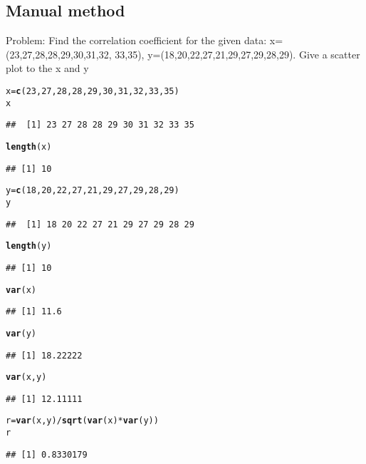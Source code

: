 \documentclass{article}\usepackage[]{graphicx}\usepackage[]{xcolor}
\makeatletter
\newcommand{\hlnum}[1]{\textcolor[rgb]{0.686,0.059,0.569}{#1}}%
\newcommand{\hlopt}[1]{\textcolor[rgb]{0,0,0}{#1}}%
\newcommand{\hldef}[1]{\textcolor[rgb]{0.345,0.345,0.345}{#1}}%
\newcommand{\hlkwb}[1]{\textcolor[rgb]{0.69,0.353,0.396}{#1}}%
\newcommand{\hlkwd}[1]{\textcolor[rgb]{0.737,0.353,0.396}{\textbf{#1}}}%
\newenvironment{kframe}{%
 \def\at@end@of@kframe{}%
 \ifinner\ifhmode%
  \def\at@end@of@kframe{\end{minipage}}%
  \begin{minipage}{\columnwidth}%
 \fi\fi%
 \def\FrameCommand##1{\hskip\@totalleftmargin \hskip-\fboxsep
 \colorbox{shadecolor}{##1}\hskip-\fboxsep
     \hskip-\linewidth \hskip-\@totalleftmargin \hskip\columnwidth}%
 \MakeFramed {\advance\hsize-\width
   \@totalleftmargin\z@ \linewidth\hsize
   \@setminipage}}%
 {\par\unskip\endMakeFramed%
 \at@end@of@kframe}
\newenvironment{knitrout}{}{} %
\makeatother
\begin{document}
\subsection{Manual method}
Problem: \newline
Find the correlation coefficient for the given data: x=(23,27,28,28,29,30,31,32, 33,35), y=(18,20,22,27,21,29,27,29,28,29). Give a scatter plot to the x and y
\begin{knitrout}
\color{fgcolor}\begin{kframe}
\begin{alltt}
\hldef{x}\hlkwb{=}\hlkwd{c}\hldef{(}\hlnum{23}\hldef{,}\hlnum{27}\hldef{,}\hlnum{28}\hldef{,}\hlnum{28}\hldef{,}\hlnum{29}\hldef{,}\hlnum{30}\hldef{,}\hlnum{31}\hldef{,}\hlnum{32}\hldef{,} \hlnum{33}\hldef{,}\hlnum{35}\hldef{)}
\hldef{x}
\end{alltt}
\begin{verbatim}
##  [1] 23 27 28 28 29 30 31 32 33 35
\end{verbatim}
\begin{alltt}
\hlkwd{length}\hldef{(x)}
\end{alltt}
\begin{verbatim}
## [1] 10
\end{verbatim}
\begin{alltt}
\hldef{y}\hlkwb{=}\hlkwd{c}\hldef{(}\hlnum{18}\hldef{,}\hlnum{20}\hldef{,}\hlnum{22}\hldef{,}\hlnum{27}\hldef{,}\hlnum{21}\hldef{,}\hlnum{29}\hldef{,}\hlnum{27}\hldef{,}\hlnum{29}\hldef{,}\hlnum{28}\hldef{,}\hlnum{29}\hldef{)}
\hldef{y}
\end{alltt}
\begin{verbatim}
##  [1] 18 20 22 27 21 29 27 29 28 29
\end{verbatim}
\begin{alltt}
\hlkwd{length}\hldef{(y)}
\end{alltt}
\begin{verbatim}
## [1] 10
\end{verbatim}
\begin{alltt}
\hlkwd{var}\hldef{(x)}
\end{alltt}
\begin{verbatim}
## [1] 11.6
\end{verbatim}
\begin{alltt}
\hlkwd{var}\hldef{(y)}
\end{alltt}
\begin{verbatim}
## [1] 18.22222
\end{verbatim}
\begin{alltt}
\hlkwd{var}\hldef{(x, y)}
\end{alltt}
\begin{verbatim}
## [1] 12.11111
\end{verbatim}
\begin{alltt}
\hldef{r}\hlkwb{=}\hlkwd{var}\hldef{(x,y)}\hlopt{/}\hlkwd{sqrt}\hldef{(}\hlkwd{var}\hldef{(x)}\hlopt{*}\hlkwd{var}\hldef{(y))}
\hldef{r}
\end{alltt}
\begin{verbatim}
## [1] 0.8330179
\end{verbatim}
\end{kframe}
\end{knitrout}
\end{document}
